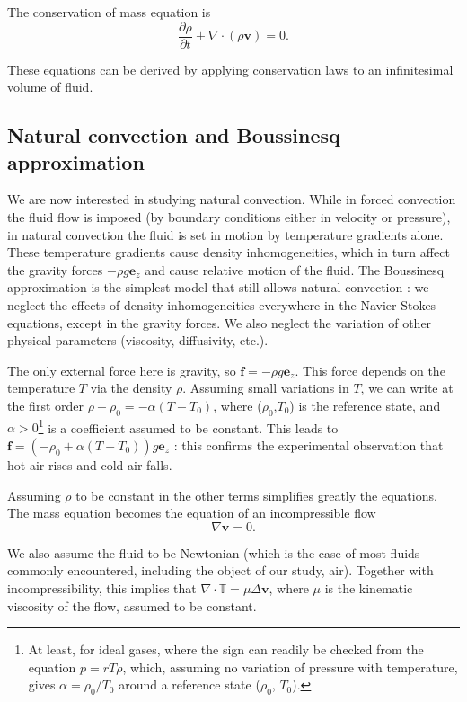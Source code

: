 \documentclass[12pt]{article}
\newcommand{\vb}[1]{\ensuremath{\boldsymbol #1}}
\begin{document}
The conservation of mass equation is
\begin{equation}
  \label{ns-mass}
  \frac{\partial \rho}{\partial t} + \nabla \cdot (\rho \vb{v}) = 0.
\end{equation}

These equations can be derived by applying conservation laws to an
infinitesimal volume of fluid.
\subsection{Natural convection and Boussinesq approximation}
We are now interested in studying natural convection. While in forced
convection the fluid flow is imposed (by boundary conditions either in
velocity or pressure), in natural convection the fluid is set in
motion by temperature gradients alone.  These temperature gradients
cause density inhomogeneities, which in turn affect the gravity forces
$- \rho g \vb{e_z}$ and cause relative motion of the fluid. The
Boussinesq approximation is the simplest model that still allows
natural convection : we neglect the effects of density inhomogeneities
everywhere in the Navier-Stokes equations, except in the gravity
forces. We also neglect the variation of other physical parameters
(viscosity, diffusivity, etc.).

The only external force here is gravity, so $\vb{f} = -\rho g
\vb{e_z}$. This force depends on the temperature $T$ via the density
$\rho$. Assuming small variations in $T$, we can write at the first
order $\rho - \rho_0 = - \alpha (T - T_0)$, where ($\rho_0$,$T_0$) is the
reference state, and $\alpha > 0$\footnote{At least, for ideal
  gases, where the sign can readily be checked from the equation $p =
  r T \rho$, which, assuming no variation of pressure with
  temperature, gives $\alpha = \rho_0/T_0$ around a reference state
  ($\rho_0$, $T_0$).}  is a coefficient assumed to be constant. This
leads to $\vb{f} = (-\rho_0 + \alpha (T - T_0)) g \vb{e_z}$ : this
confirms the experimental observation that hot air rises and cold air
falls.

Assuming $\rho$ to be constant in the other terms simplifies greatly
the equations. The mass equation becomes the equation of an
incompressible flow
\begin{equation}
  \label{ns-b-mass}
  \nabla \vb{v} = 0.
\end{equation}

We also assume the fluid to be Newtonian (which is the case of most
fluids commonly encountered, including the object of our study,
air). Together with incompressibility, this implies that $\nabla \cdot
\mathbb T = \mu \Delta \vb{v}$, where $\mu$ is the kinematic viscosity
of the flow, assumed to be constant.
\end{document}

